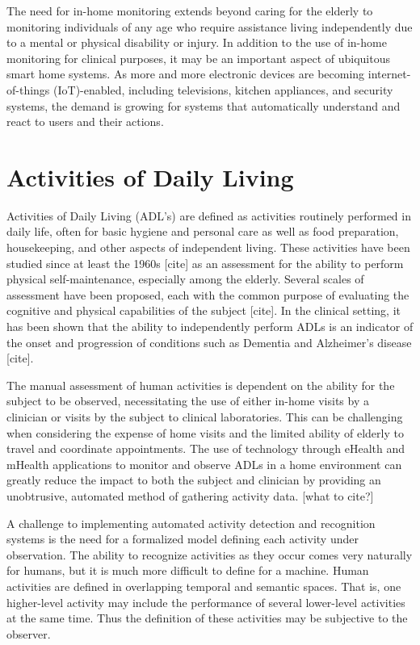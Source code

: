 \documentclass[12pt]{report}
\begin{document}
The need for in-home monitoring extends beyond caring for the elderly to monitoring individuals of any age who require assistance living independently due to a mental or physical disability or injury. In addition to the use of in-home monitoring for clinical purposes, it may be an important aspect of ubiquitous smart home systems. As more and more electronic devices are becoming internet-of-things (IoT)-enabled, including televisions, kitchen appliances, and security systems, the demand is growing for systems that automatically understand and react to users and their actions.


\section{Activities of Daily Living}
Activities of Daily Living (ADL’s) are defined as activities routinely performed in daily life, often for basic hygiene and personal care as well as food preparation, housekeeping, and other aspects of independent living. These activities have been studied since at least the 1960s [cite] as an assessment for the ability to perform physical self-maintenance, especially among the elderly. Several scales of assessment have been proposed, each with the common purpose of evaluating the cognitive and physical capabilities of the subject [cite]. In the clinical setting, it has been shown that the ability to independently perform ADLs is an indicator of the onset and progression of conditions such as Dementia and Alzheimer's disease [cite].

The manual assessment of human activities is dependent on the ability for the subject to be observed, necessitating the use of either in-home visits by a clinician or visits by the subject to clinical laboratories. This can be challenging when considering the expense of home visits and the limited ability of elderly to travel and coordinate appointments. The use of technology through eHealth and mHealth applications to monitor and observe ADLs in a home environment can greatly reduce the impact to both the subject and clinician by providing an unobtrusive, automated method of gathering activity data. [what to cite?]

A challenge to implementing automated activity detection and recognition systems is the need for a formalized model defining each activity under observation. The ability to recognize activities as they occur comes very naturally for humans, but it is much more difficult to define for a machine. Human activities are defined in overlapping temporal and semantic spaces. That is, one higher-level activity may include the performance of several lower-level activities at the same time. Thus the definition of these activities may be subjective to the observer. 
\end{document}
